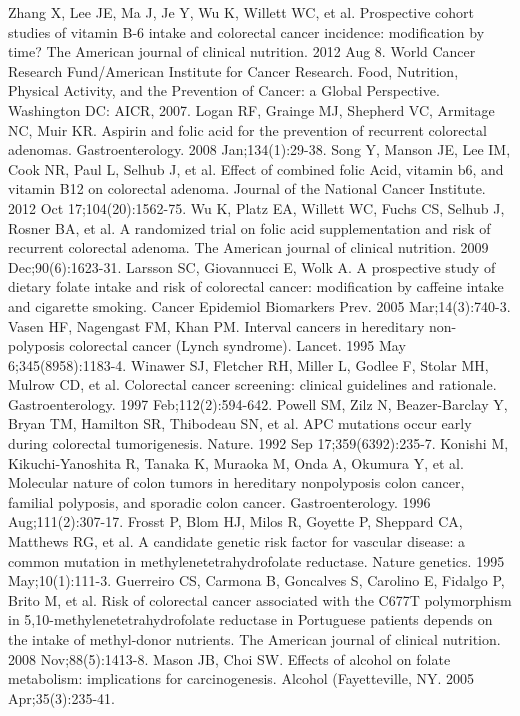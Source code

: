 \begin{thebibliography}{12}
		Zhang X, Lee JE, Ma J, Je Y, Wu K, Willett WC, et al. Prospective cohort studies of vitamin B-6 intake and colorectal cancer incidence: modification by time? The American journal of clinical nutrition. 2012 Aug 8. 
		World Cancer Research Fund/American Institute for Cancer Research. Food, Nutrition, Physical Activity, and the Prevention of Cancer: a Global Perspective. Washington DC: AICR, 2007. 
		Logan RF, Grainge MJ, Shepherd VC, Armitage NC, Muir KR. Aspirin and folic acid for the prevention of recurrent colorectal adenomas. Gastroenterology. 2008 Jan;134(1):29-38. 
		Song Y, Manson JE, Lee IM, Cook NR, Paul L, Selhub J, et al. Effect of combined folic Acid, vitamin b6, and vitamin B12 on colorectal adenoma. Journal of the National Cancer Institute. 2012 Oct 17;104(20):1562-75. 
		Wu K, Platz EA, Willett WC, Fuchs CS, Selhub J, Rosner BA, et al. A randomized trial on folic acid supplementation and risk of recurrent colorectal adenoma. The American journal of clinical nutrition. 2009 Dec;90(6):1623-31. 
		Larsson SC, Giovannucci E, Wolk A. A prospective study of dietary folate intake and risk of colorectal cancer: modification by caffeine intake and cigarette smoking. Cancer Epidemiol Biomarkers Prev. 2005 Mar;14(3):740-3. 
		Vasen HF, Nagengast FM, Khan PM. Interval cancers in hereditary non-polyposis colorectal cancer (Lynch syndrome). Lancet. 1995 May 6;345(8958):1183-4. 
		Winawer SJ, Fletcher RH, Miller L, Godlee F, Stolar MH, Mulrow CD, et al. Colorectal cancer screening: clinical guidelines and rationale. Gastroenterology. 1997 Feb;112(2):594-642. 
		Powell SM, Zilz N, Beazer-Barclay Y, Bryan TM, Hamilton SR, Thibodeau SN, et al. APC mutations occur early during colorectal tumorigenesis. Nature. 1992 Sep 17;359(6392):235-7. 
		Konishi M, Kikuchi-Yanoshita R, Tanaka K, Muraoka M, Onda A, Okumura Y, et al. Molecular nature of colon tumors in hereditary nonpolyposis colon cancer, familial polyposis, and sporadic colon cancer. Gastroenterology. 1996 Aug;111(2):307-17. 
		Frosst P, Blom HJ, Milos R, Goyette P, Sheppard CA, Matthews RG, et al. A candidate genetic risk factor for vascular disease: a common mutation in methylenetetrahydrofolate reductase. Nature genetics. 1995 May;10(1):111-3. 
		Guerreiro CS, Carmona B, Goncalves S, Carolino E, Fidalgo P, Brito M, et al. Risk of colorectal cancer associated with the C677T polymorphism in 5,10-methylenetetrahydrofolate reductase in Portuguese patients depends on the intake of methyl-donor nutrients. The American journal of clinical nutrition. 2008 Nov;88(5):1413-8. 
		Mason JB, Choi SW. Effects of alcohol on folate metabolism: implications for carcinogenesis. Alcohol (Fayetteville, NY. 2005 Apr;35(3):235-41. 
\end{thebibliography} 
